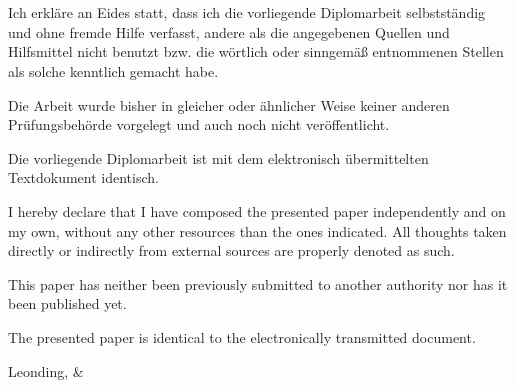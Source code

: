 \thispagestyle{empty}
\vspace{3cm}
~ \\ \\
{
Ich erkläre an Eides statt, dass ich die vorliegende Diplomarbeit selbstständig und ohne fremde Hilfe verfasst, andere als die angegebenen Quellen und Hilfsmittel nicht benutzt bzw. die wörtlich oder sinngemäß entnommenen Stellen als solche kenntlich gemacht habe.

Die Arbeit wurde bisher in gleicher oder ähnlicher Weise keiner anderen Prüfungsbehörde vorgelegt und auch noch nicht veröffentlicht.

Die vorliegende Diplomarbeit ist mit dem elektronisch übermittelten Textdokument identisch.
}
{
I hereby declare that I have composed the presented paper independently and on my own, without any other resources than the ones indicated. 
All thoughts taken directly or indirectly from external sources are properly denoted as such.

This paper has neither been previously submitted to another authority nor has it been published yet.

The presented paper is identical to the electronically transmitted document.
}
\vspace{3cm}
\begin{tabbing}
Leonding,  \hspace{2cm} {\firstauthor} \& {\secondauthor} %
\end{tabbing}
\vspace{10cm}
\newpage
\setcounter{page}{1}
